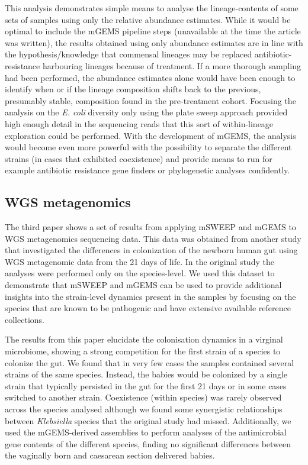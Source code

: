 \documentclass[officiallayout]{tktla}
\begin{document}
This analysis demonstrates simple means to analyse the
lineage-contents of some sets of samples using only the relative
abundance estimates. While it would be optimal to include the mGEMS
pipeline steps (unavailable at the time the article was written), the
results obtained using only abundance estimates are in line with the
hypothesis/knowledge that commensal lineages may be replaced
antibiotic-resistance harbouring lineages because of treatment. If a
more thorough sampling had been performed, the abundance estimates
alone would have been enough to identify when or if the lineage
composition shifts back to the previous, presumably stable,
composition found in the pre-treatment cohort. Focusing the analysis
on the \textit{E. coli} diversity only using the plate sweep approach
provided high enough detail in the sequencing reads that this sort of
within-lineage exploration could be performed. With the development of
mGEMS, the analysis would become even more powerful with the
possibility to separate the different strains (in cases that exhibited
coexistence) and provide means to run for example antibiotic
resistance gene finders or phylogenetic analyses confidently.

\subsection{WGS metagenomics}

The third paper shows a set of results from applying mSWEEP and mGEMS
to WGS metagenomics sequencing data. This data was obtained from
another study that investigated the differences in colonization of the
newborn human gut using WGS metagenomic data from the 21 days of
life. In the original study the analyses were performed only on the
species-level. We used this dataset to demonstrate that mSWEEP and
mGEMS can be used to provide additional insights into the strain-level
dynamics present in the samples by focusing on the species that are
known to be pathogenic and have extensive available reference
collections.

The results from this paper elucidate the colonisation dynamics in a
virginal microbiome, showing a strong competition for the first strain
of a species to colonize the gut. We found that in very few cases the
samples contained several strains of the same species. Instead, the
babies would be colonized by a single strain that typically persisted
in the gut for the first 21 days or in some cases switched to another
strain. Coexistence (within species) was rarely observed across the
species analysed although we found some synergistic relationships
between \textit{Klebsiella} species that the original study had
missed. Additionally, we used the mGEMS-derived assemblies to perform
analyses of the antimicrobial gene contents of the different species,
finding no significant differences between the vaginally born and
caesarean section delivered babies.
\end{document}
